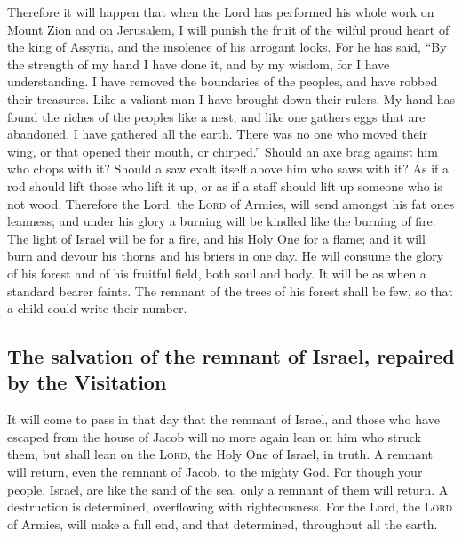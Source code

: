  Therefore it will happen that when the Lord has
performed his whole work on Mount Zion and on Jerusalem, I will punish
the fruit of the wilful proud heart of the king of Assyria, and the
insolence of his arrogant looks.  For he has said, ``By
the strength of my hand I have done it, and by my wisdom, for I have
understanding. I have removed the boundaries of the peoples, and have
robbed their treasures. Like a valiant man I have brought down their
rulers.  My hand has found the riches of the peoples like
a nest, and like one gathers eggs that are abandoned, I have gathered
all the earth. There was no one who moved their wing, or that opened
their mouth, or chirped.''  Should an axe brag against
him who chops with it? Should a saw exalt itself above him who saws with
it? As if a rod should lift those who lift it up, or as if a staff
should lift up someone who is not wood.  Therefore the
Lord, the \textsc{Lord} of Armies, will send amongst his fat ones
leanness; and under his glory a burning will be kindled like the burning
of fire.  The light of Israel will be for a fire, and his
Holy One for a flame; and it will burn and devour his thorns and his
briers in one day.  He will consume the glory of his
forest and of his fruitful field, both soul and body. It will be as when
a standard bearer faints.  The remnant of the trees of
his forest shall be few, so that a child could write their number.

\hypertarget{the-salvation-of-the-remnant-of-israel-repaired-by-the-visitation}{%
\subsection{The salvation of the remnant of Israel, repaired by the
Visitation}\label{the-salvation-of-the-remnant-of-israel-repaired-by-the-visitation}}

 It will come to pass in that day that the remnant of
Israel, and those who have escaped from the house of Jacob will no more
again lean on him who struck them, but shall lean on the \textsc{Lord},
the Holy One of Israel, in truth.  A remnant will return,
even the remnant of Jacob, to the mighty God.  For though
your people, Israel, are like the sand of the sea, only a remnant of
them will return. A destruction is determined, overflowing with
righteousness.  For the Lord, the \textsc{Lord} of
Armies, will make a full end, and that determined, throughout all the
earth.

